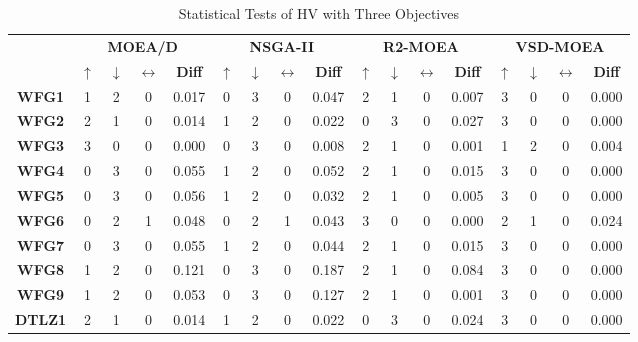 \begin{table*}[t]
\caption{Statistical Tests of HV with Three Objectives}
\label{tab:Tests_HV_3obj}
\centering
\begin{tabular}{c c|c|c|c|c|c|c|c|c|c|c|c|c|c|c|c}
\cline{2-17}
 \multirow{2}{*}{} & \multicolumn{4}{c|}{\textbf{MOEA/D}} & \multicolumn{4}{c|}{\textbf{NSGA-II}} & \multicolumn{4}{c|}{\textbf{R2-MOEA}} & \multicolumn{4}{c}{\textbf{VSD-MOEA}} \\ \cline{2-17} 
 & \textbf{$\uparrow$} & \textbf{$\downarrow$} & \textbf{$\leftrightarrow$} & \textbf{Diff} & \textbf{$\uparrow$} & \textbf{$\downarrow$} & \textbf{$\leftrightarrow$} & \textbf{Diff} & \textbf{$\uparrow$} & \textbf{$\downarrow$} & \textbf{$\leftrightarrow$} & \textbf{Diff} & \textbf{$\uparrow$} & \textbf{$\downarrow$} & \textbf{$\leftrightarrow$} & \textbf{Diff} \\ \hline
\multicolumn{1}{c|}{\textbf{WFG1}} & 1 & 2 & 0 & 0.017 & 0 & 3 & 0 & 0.047 & 2 & 1 & 0 & 0.007 & 3 & 0 & 0 & 0.000 \\ \hline
\multicolumn{1}{c|}{\textbf{WFG2}} & 2 & 1 & 0 & 0.014 & 1 & 2 & 0 & 0.022 & 0 & 3 & 0 & 0.027 & 3 & 0 & 0 & 0.000 \\ \hline
\multicolumn{1}{c|}{\textbf{WFG3}} & 3 & 0 & 0 & 0.000 & 0 & 3 & 0 & 0.008 & 2 & 1 & 0 & 0.001 & 1 & 2 & 0 & 0.004 \\ \hline
\multicolumn{1}{c|}{\textbf{WFG4}} & 0 & 3 & 0 & 0.055 & 1 & 2 & 0 & 0.052 & 2 & 1 & 0 & 0.015 & 3 & 0 & 0 & 0.000 \\ \hline
\multicolumn{1}{c|}{\textbf{WFG5}} & 0 & 3 & 0 & 0.056 & 1 & 2 & 0 & 0.032 & 2 & 1 & 0 & 0.005 & 3 & 0 & 0 & 0.000 \\ \hline
\multicolumn{1}{c|}{\textbf{WFG6}} & 0 & 2 & 1 & 0.048 & 0 & 2 & 1 & 0.043 & 3 & 0 & 0 & 0.000 & 2 & 1 & 0 & 0.024 \\ \hline
\multicolumn{1}{c|}{\textbf{WFG7}} & 0 & 3 & 0 & 0.055 & 1 & 2 & 0 & 0.044 & 2 & 1 & 0 & 0.015 & 3 & 0 & 0 & 0.000 \\ \hline
\multicolumn{1}{c|}{\textbf{WFG8}} & 1 & 2 & 0 & 0.121 & 0 & 3 & 0 & 0.187 & 2 & 1 & 0 & 0.084 & 3 & 0 & 0 & 0.000 \\ \hline
\multicolumn{1}{c|}{\textbf{WFG9}} & 1 & 2 & 0 & 0.053 & 0 & 3 & 0 & 0.127 & 2 & 1 & 0 & 0.001 & 3 & 0 & 0 & 0.000 \\ \hline
\multicolumn{1}{c|}{\textbf{DTLZ1}} & 2 & 1 & 0 & 0.014 & 1 & 2 & 0 & 0.022 & 0 & 3 & 0 & 0.024 & 3 & 0 & 0 & 0.000 \\ \hline

\end{tabular}
\end{table*}
